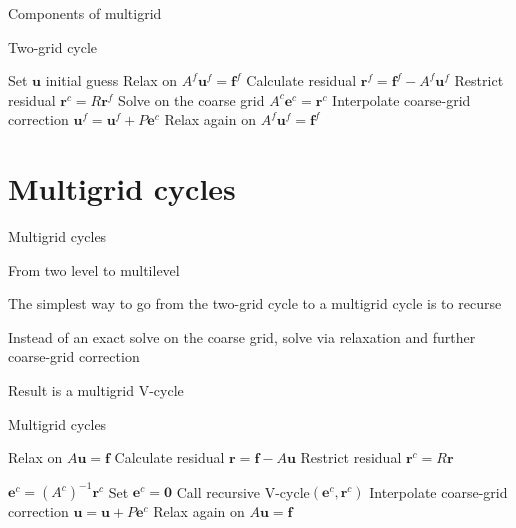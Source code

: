 \documentclass[18pt,xcolor=table]{beamer}
\begin{document}
\begin{frame}{Components of multigrid}
\begin{block}{Two-grid cycle}
\begin{algorithm}[H]
\caption{Two-grid cycle}
\begin{algorithmic}
\State Set $\mathbf{u}$ initial guess
\State Relax on $A^f\mathbf{u}^f = \mathbf{f}^f$
\State Calculate residual $\mathbf{r}^f = \mathbf{f}^f - A^f\mathbf{u}^f$
\State Restrict residual $\mathbf{r}^c = R\mathbf{r}^f$
\State Solve on the coarse grid $A^c\mathbf{e}^c = \mathbf{r}^c$
\State Interpolate coarse-grid correction $\mathbf{u}^f = \mathbf{u}^f + P\mathbf{e}^c$
\State Relax again on $A^f\mathbf{u}^f = \mathbf{f}^f$
\end{algorithmic}
\end{algorithm}
\end{block}
\end{frame}


\section{Multigrid cycles}

\begin{frame}{Multigrid cycles}
\begin{block}{From two level to multilevel}
\bit
\item The simplest way to go from the two-grid cycle to a multigrid cycle is to recurse
\item Instead of an exact solve on the coarse grid, solve via relaxation and further coarse-grid correction
\item Result is a multigrid V-cycle
\eit
\end{block}
\end{frame}

\begin{frame}{Multigrid cycles}

\begin{algorithm}[H]
\caption{Recursive V-cycle$(\mathbf{u},\mathbf{f})$}
\begin{algorithmic}
\State Relax on $A\mathbf{u} = \mathbf{f}$
\State Calculate residual $\mathbf{r} = \mathbf{f} - A\mathbf{u}$
\State Restrict residual $\mathbf{r}^c = R\mathbf{r}$

\State $\mathbf{e}^c = (A^c)^{-1}\mathbf{r}^c$
\Else
\State Set $\mathbf{e}^c = \mathbf{0}$
\State Call recursive V-cycle$(\mathbf{e}^c, \mathbf{r}^c)$
\EndIf
\State Interpolate coarse-grid correction $\mathbf{u} = \mathbf{u} + P\mathbf{e}^c$
\State Relax again on $A\mathbf{u} = \mathbf{f}$
\end{algorithmic}
\end{algorithm}
\end{frame}
\end{document}
